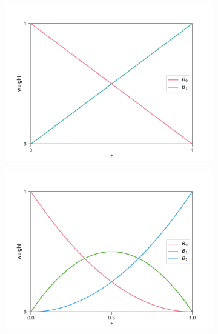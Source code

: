\begin{figure}
\centering
\begin{subfigure}{0.5\linewidth}
\includegraphics[width=\linewidth]{figs/bernstein1}
\caption{}%
\label{subfig:bernstein1}
\end{subfigure}%
\begin{subfigure}{0.5\linewidth}
\includegraphics[width=\linewidth]{figs/bernstein2}
\caption{}%
\label{subfig:bernstein2}
\end{subfigure}\\
\begin{subfigure}{0.5\linewidth}

\end{subfigure}
\end{figure}
